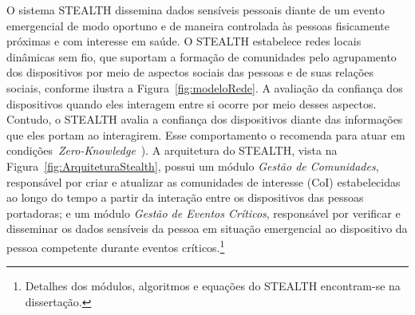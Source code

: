 \documentclass[12pt]{article}
\newcommand{\agn}[1]{\textcolor{auburn}{#1}}
\begin{document}
O sistema \mbox{STEALTH} dissemina dados sensíveis pessoais diante de um evento emergencial de modo oportuno e de maneira controlada às pessoas fisicamente próximas e com interesse em saúde. O \mbox{STEALTH} estabelece redes locais dinâmicas sem fio, que suportam a formação de comunidades pelo agrupamento dos dispositivos por meio de aspectos sociais das pessoas e de suas relações sociais, conforme ilustra a Figura~\ref{fig:modeloRede}.
\agn{A avaliação da}
confiança dos dispositivos quando eles interagem entre si
\agn{ocorre por meio desses aspectos.}
Contudo, o \mbox{STEALTH} avalia a confiança dos dispositivos
\agn{diante das}
informações que eles portam ao interagirem. Esse comportamento o recomenda para atuar em condições~\textit{Zero-Knowledge}~\cite{kim2015hcs}).
A arquitetura do \mbox{STEALTH}, vista 
na Figura~\ref{fig:ArquiteturaStealth}, possui um módulo {\it Gestão de Comunidades}, responsável por criar e atualizar as comunidades de interesse (CoI) estabelecidas ao longo do tempo a partir da interação entre os dispositivos das pessoas portadoras; e um módulo {\it Gestão de Eventos Críticos}, responsável por verificar e disseminar os dados sensíveis da pessoa em situação emergencial ao dispositivo da pessoa competente durante eventos críticos.\footnote{Detalhes dos módulos, algoritmos e equações do  \mbox{STEALTH} encontram-se na dissertação.}
\end{document}
